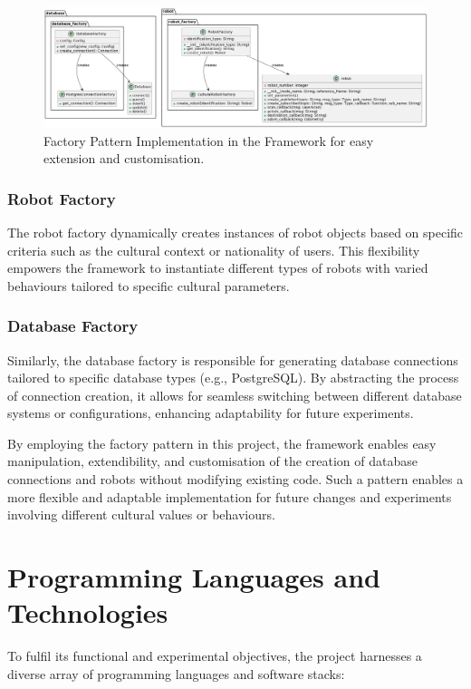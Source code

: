 \begin{figure}
   \noindent\includegraphics[width=\linewidth]{Chapter5/factory.png}  
   \caption{Factory Pattern Implementation in the Framework for easy extension and customisation.}
  \label{fig:figure2}
\end{figure}

\subsubsection{Robot Factory}

The robot factory dynamically creates instances of robot objects based on specific criteria such as the cultural context or nationality of users. This flexibility empowers the framework to instantiate different types of robots with varied behaviours tailored to specific cultural parameters.

\subsubsection{Database Factory}

Similarly, the database factory is responsible for generating database connections tailored to specific database types (e.g., PostgreSQL). By abstracting the process of connection creation, it allows for seamless switching between different database systems or configurations, enhancing adaptability for future experiments.

By employing the factory pattern in this project, the framework enables easy manipulation, extendibility, and customisation of the creation of database connections and robots without modifying existing code. Such a pattern enables a more flexible and adaptable implementation for future changes and experiments involving different cultural values or behaviours.

\section{Programming Languages and Technologies}

To fulfil its functional and experimental objectives, the project harnesses a diverse array of programming languages and software stacks:

